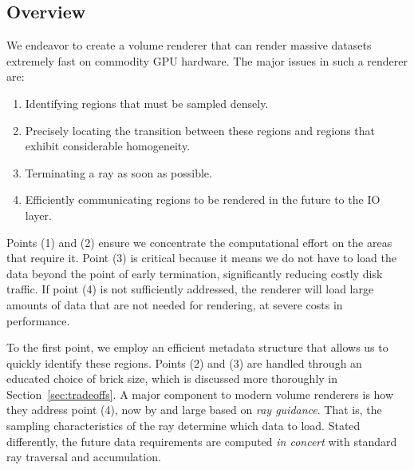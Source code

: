 \subsection{Overview}

We endeavor to create a volume renderer that can render massive 
datasets extremely fast on commodity GPU hardware.  The major issues in
such a renderer are:
\begin{enumerate}
  \itemsep0em
  \item Identifying regions that must be sampled densely.

  \item Precisely locating the transition between these regions and
  regions that exhibit considerable homogeneity.

  \item Terminating a ray as soon as possible.

  \item Efficiently communicating regions to be rendered in the future
  to the IO layer.

\end{enumerate}

Points (1) and (2) ensure we concentrate the computational effort on
the areas that require it.  Point (3) is critical because it means we
do not have to load the data beyond the point of early termination,
significantly reducing costly disk traffic.  If point (4) is not
sufficiently addressed, the renderer will load large amounts of data
that are not needed for rendering, at severe costs in performance.


To the first point, we employ an efficient metadata structure that
allows us to quickly identify these regions.  Points (2) and (3) are
handled through an educated choice of brick size, which is discussed
more thoroughly in Section~\ref{sec:tradeoffs}.  A major component to
modern volume renderers is how they address point (4), now by and large
based on \emph{ray guidance}.  That is, the sampling characteristics of
the ray determine which data to load.  Stated differently, the future
data requirements are computed \emph{in concert} with standard ray
traversal and accumulation.


